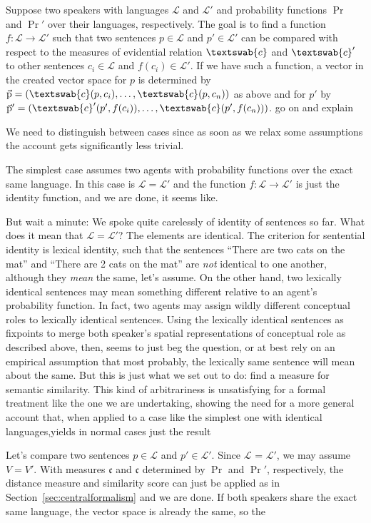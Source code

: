 \documentclass[11pt, a4paper]{scrartcl}
\renewcommand{\i}[1]{\emph{#1}}
\renewcommand{\L}{\mathcal{L}}
\renewcommand{\v}[1]{\vec{\mathrm{#1}}}
\newcommand{\m}[1]{\textswab{#1}}
\begin{document}
Suppose two speakers with languages $\L$ and $\L'$ and probability functions $\Pr$ and $\Pr'$ over their languages, respectively. The goal is to find a function ${f: \L \rightarrow \L'}$ such that two sentences $p \in \L$ and $p' \in \L'$ can be compared with respect to the measures of evidential relation $\m{c}$ and $\m{c}'$ to other sentences $c_i \in \L$ and $f(c_i) \in \L'$. If we have such a function, a vector in the created vector space for $p$ is determined by $\v{p} = (\m{c}(p,c_i),\ldots,\m{c}(p,c_n))$ as above and for $p'$ by $\v{p}' = (\m{c}'(p',f(c_i)),\ldots,\m{c}(p',f(c_n)))$. {\color{red} go on and explain} 

We need to distinguish between cases since as soon as we relax some assumptions the account gets significantly less trivial.

The simplest case assumes two agents with probability functions over the exact same language. In this case is $\L = \L'$ and the function $f: \L \rightarrow \L'$ is just the identity function, and we are done, it seems like.

But wait a minute: We spoke quite carelessly of identity of sentences so far. What does it mean that $\L = \L'$? The elements are identical. The criterion for sentential identity is lexical identity, such that the sentences ``There are two cats on the mat'' and ``There are 2 cats on the mat'' are \i{not} identical to one another, although they \i{mean} the same, let's assume. On the other hand, two lexically identical sentences may mean something different relative to an agent's probability function. In fact, two agents may assign wildly different conceptual roles to lexically identical sentences. Using the lexically identical sentences as fixpoints to merge both speaker's spatial representations of conceptual role as described above, then, seems to just beg the question, or at best rely on an empirical assumption that most probably, the lexically same sentence will mean about the same. But this is just what we set out to do: find a measure for semantic similarity. This kind of arbitrariness is unsatisfying for a formal treatment like the one we are undertaking, showing the need for a more general account that, when applied to a case like the simplest one with identical languages,yields in normal cases just the result  

 Let's compare two sentences $p \in \L$ and $p' \in \L'$. Since $\L$ = $\L'$, we may assume $V = V'$. With measures $\mathfrak{c}$ and $\mathfrak{c}$ determined by $\Pr$ and $\Pr'$, respectively, the distance measure and similarity score can just be applied as in Section~\ref{sec:centralformalism} and we are done. If both speakers share the exact same language, the vector space is already the same, so the 
\end{document}
